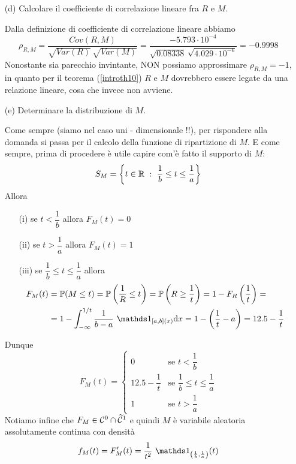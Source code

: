 \begin{enumerate}
\item [(d)] Calcolare il coefficiente di correlazione lineare fra $R$ e $M$.

Dalla definizione di coefficiente di correlazione lineare abbiamo
\[
\rho_{R,M}=\frac{Cov(R,M)}{\sqrt{Var(R)}\,\sqrt{Var(M)}}=\frac{-5.793\cdot 10^{-4}}{\sqrt{0.08338}\,\sqrt{4.029\cdot 10^{-6}}}=-0.9998
\]
Nonostante sia parecchio invintante, NON possiamo approssimare $\rho_{R,M}=-1$, in quanto per il teorema (\ref{introth10}) $R$ e $M$ dovrebbero essere legate da una relazione lineare, cosa che invece non avviene.

\item [(e)] Determinare la distribuzione di $M$.

Come sempre (siamo nel caso uni - dimensionale !!), per rispondere alla domanda si passa per il calcolo della funzione di ripartizione di $M$. E come sempre, prima di procedere è utile capire com'è fatto il supporto di $M$:
\[
S_M=\left\{ t\in\mathbb{R}\ :\ \frac{1}{b}\leq t\leq\frac{1}{a}  \right\}
\]
Allora
\begin{enumerate}
\item [(i)] se $t<\dfrac{1}{b}$ allora $F_M(t)=0$

\item [(ii)] se $t>\dfrac{1}{a}$ allora $F_M(t)=1$

\item [(iii)] se $\dfrac{1}{b}\leq t\leq\dfrac{1}{a}$ allora
\begin{gather*}
\begin{aligned}
F_M(t)&=\PP(M\leq t)=\PP\left(\frac{1}{R}\leq t\right)=\PP\left(R\geq\frac{1}{t}\right)=1-F_R\left(\frac{1}{t}\right)=\\
&=1-\int_{-\infty}^{1/t}\frac{1}{b-a}\ \Ind_{[a,b](x)}\dx=1-\left(\frac{1}{t}-a\right)=12.5-\frac{1}{t}
\end{aligned}
\end{gather*}
\end{enumerate}
Dunque
\[
F_M(t)=
\begin{cases}
0                               &\text{se }t<\dfrac{1}{b} \\
12.5-\dfrac{1}{t}        &\text{se } \dfrac{1}{b}\leq t\leq \dfrac{1}{a}  \\
1                               &\text{se }t>\dfrac{1}{a}
\end{cases}
\]
Notiamo infine che $F_M\in\mathcal{C}^0\cap\widetilde{\mathcal{C}}^1$ e quindi $M$ è variabile aleatoria assolutamente continua con densità
\[
f_M(t)=F_M'(t)=\frac{1}{t^2}\ \Ind_{\left(\frac{1}{b},\frac{1}{a}\right)}(t)
\]


\end{enumerate}

